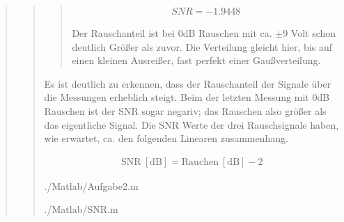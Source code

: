 \begin{quote}
\begin{quote}
\begin{quote}
            \begin{equation*}
            \begin{split}
                 SNR = -1.9448
            \end{split}
            \end{equation*}
            
            Der Rauschanteil ist bei 0dB Rauschen mit ca. $\pm9$ Volt schon deutlich Größer als zuvor. Die Verteilung gleicht
            hier, bis auf einen kleinen Ausreißer, fast perfekt einer Gaußverteilung.
            
        \end{quote}
        
        \vspace{4em}
        
        Es ist deutlich zu erkennen, dass der Rauschanteil der Signale über die Messungen erheblich steigt.
        Beim der letzten Messung mit 0dB Rauschen ist der SNR sogar negariv; das Rauschen also größer als das eigentliche Signal.
        Die SNR Werte der drei Rauschsignale haben, wie erwartet, ca. den folgenden Linearen zusammenhang.
        
        \begin{equation*}
    	\begin{split}
    		\mathrm{SNR \ [dB]} = \mathrm{Rauchen \ [dB]} - 2 
    	\end{split}
        \end{equation*}
        
        \newpage
        
            {./Matlab/Aufgabe2.m}
        
        
            {./Matlab/SNR.m}
        
    \end{quote}
    
    
\end{quote}





%     
%         

